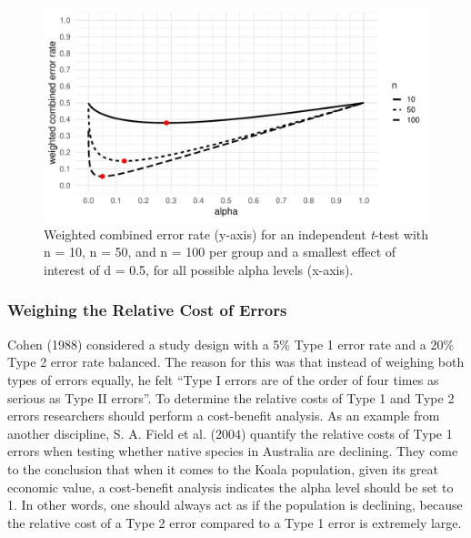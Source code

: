 \documentclass[
  english,
  ,jou,floatsintext]{apa6}
\begin{document}
\begin{figure}
\centering
\includegraphics{Justify_in_Practice_files/figure-latex/weight-plot-1.pdf}
\caption{\label{fig:weight-plot}Weighted combined error rate (y-axis) for an independent \emph{t}-test with n = 10, n = 50, and n = 100 per group and a smallest effect of interest of d = 0.5, for all possible alpha levels (x-axis).}
\end{figure}

\hypertarget{weighing-the-relative-cost-of-errors}{%
\subsubsection{Weighing the Relative Cost of Errors}\label{weighing-the-relative-cost-of-errors}}

Cohen (1988) considered a study design with a 5\% Type 1 error rate and a 20\% Type 2 error rate balanced. The reason for this was that instead of weighing both types of errors equally, he felt ``Type I errors are of the order of four times as serious as Type II errors''. To determine the relative costs of Type 1 and Type 2 errors researchers should perform a cost-benefit analysis. As an example from another discipline, S. A. Field et al. (2004) quantify the relative costs of Type 1 errors when testing whether native species in Australia are declining. They come to the conclusion that when it comes to the Koala population, given its great economic value, a cost-benefit analysis indicates the alpha level should be set to 1. In other words, one should always act as if the population is declining, because the relative cost of a Type 2 error compared to a Type 1 error is extremely large.
\end{document}
